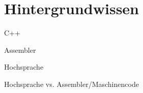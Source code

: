 %
%
%
%
%
%
%
%



\section{Hintergrundwissen}
C++

Assembler

Hochsprache

Hochsprache vs. Assembler/Maschinencode
































